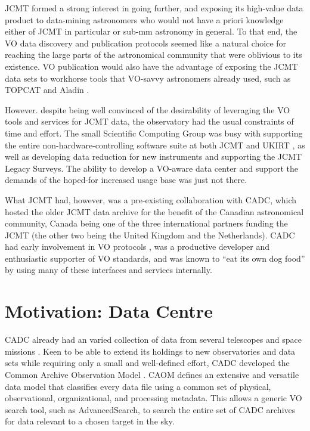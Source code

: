 \documentclass[final,authoryear,5p,times,twocolumn]{elsarticle}
\begin{document}
JCMT formed a strong interest in going further, and exposing its
high-value data product to data-mining astronomers who would not have
a priori knowledge either of JCMT in particular or sub-mm astronomy in
general. To that end, the VO data discovery and publication protocols
seemed like a natural choice for reaching the large parts of the
astronomical community that were oblivious to its existence. VO
publication would also have the advantage of exposing the JCMT data
sets to workhorse tools that VO-savvy astronomers already used, such
as TOPCAT \citep[][]{2005ASPC..347...29T} and Aladin
\citep[][]{2005ASPC..347..193O}.

However. despite being well convinced of the desirability of
leveraging the VO tools and services for JCMT data, the observatory
had the usual constraints of time and effort. The small Scientific
Computing Group was busy with supporting the entire non-hardware-controlling
software suite at both JCMT and UKIRT \citep[see e.g.,][with both
telescopes operated by the same organization]{2002SPIE.4844..321E,2011tfa..confE..42J},
as well as developing data reduction for new instruments
and supporting the JCMT Legacy Surveys. The ability to develop a
VO-aware data center and support the demands of the hoped-for
increased usage base was just not there.

What JCMT had, however, was a pre-existing collaboration with CADC,
which hosted the older JCMT data archive \citep{1997ASPC..125..397T}
for the benefit of the Canadian astronomical community, Canada being
one of the three international partners funding the JCMT (the other
two being the United Kingdom and the Netherlands). CADC had early
involvement in VO protocols \citep{2002ASPC..281...36S}, was a
productive developer and enthusiastic supporter of VO standards, and
was known to ``eat its own dog food'' by using many of these
interfaces and services internally.

\section{Motivation: Data Centre}

CADC already had an varied collection of data from several
telescopes and space missions
\citep{1994ASPC...61..123C,2008SPIE.7016E..16G}. Keen to be able to
extend its holdings to new observatories and data sets while
requiring only a small and well-defined effort, CADC developed
the Common Archive Observation Model
\citep[CAOM:][]{2007ASPC..376..347D,2008ASPC..394..426D}.  CAOM defines an extensive and
versatile data model that classifies every data file using a common set of physical,
observational, organizational, and processing metadata.
This allows a generic VO search tool, such as AdvancedSearch, to search the
entire set of CADC archives for data relevant to a chosen target in the sky.
\end{document}
